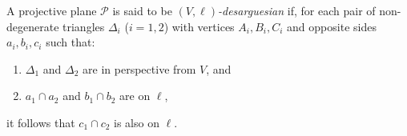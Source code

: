 A projective plane $\mathcal{P}$ is said to be \emph{$(V,\ell)$-desarguesian} if, for each pair of non-degenerate triangles $\Delta_i$ ($i=1,2$) with vertices $A_i, B_i, C_i$ and opposite sides $a_i, b_i, c_i$ such that:
\begin{enumerate}
\item[(a)] $\Delta_1$ and $\Delta_2$ are in perspective from $V$, and
\item[(b)] $a_1 \cap a_2$ and $b_1 \cap b_2$ are on $\ell$,
\end{enumerate}
it follows that $c_1 \cap c_2$ is also on $\ell$.
